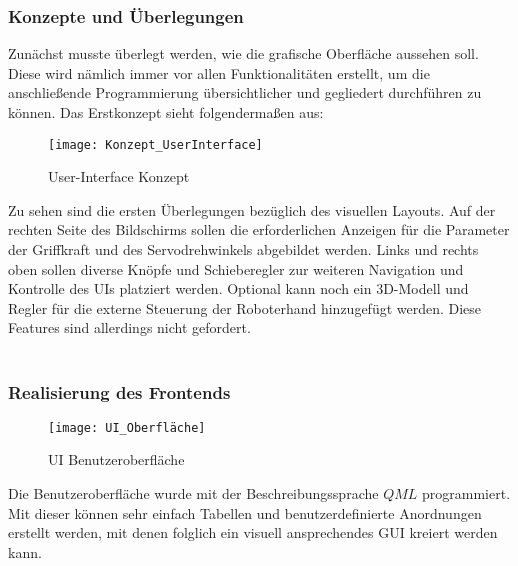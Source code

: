 \documentclass[titlepage,12pt,twoside]{article}
\begin{document}
\subsubsection{Konzepte und Überlegungen}
Zunächst musste überlegt werden, wie die grafische Oberfläche aussehen soll. Diese wird nämlich immer vor allen Funktionalitäten 
erstellt, um die anschließende Programmierung übersichtlicher und gegliedert durchführen zu können. Das Erstkonzept sieht folgendermaßen aus:
\begin{figure}[H]
	\begin{center}
		\scalebox{1.2}
		{\texttt{[image: Konzept\_UserInterface]}}
		\caption{User-Interface Konzept}
		\label{fig:Konzept_UserInterface}				
	\end{center}
\end{figure}
\hfill \break
Zu sehen sind die ersten Überlegungen bezüglich des visuellen Layouts. Auf der rechten Seite des Bildschirms sollen die erforderlichen
Anzeigen für die Parameter der Griffkraft und des Servodrehwinkels abgebildet werden. Links und rechts oben sollen diverse Knöpfe 
und Schieberegler zur weiteren Navigation und Kontrolle des UIs platziert werden. Optional kann noch ein 3D-Modell und Regler für 
die externe Steuerung der Roboterhand hinzugefügt werden. Diese Features sind allerdings nicht gefordert. \\
\\
\subsubsection{Realisierung des Frontends}
\begin{figure}[H]
	\begin{center}
		\scalebox{1.2}
		{\texttt{[image: UI\_Oberfläche]}}
		\caption{UI Benutzeroberfläche}
		\label{fig:UI_Oberfläche}				
	\end{center}
\end{figure}
\hfill \break
Die Benutzeroberfläche wurde mit der Beschreibungssprache $QML$ programmiert. Mit dieser können sehr einfach Tabellen und benutzerdefinierte
Anordnungen erstellt werden, mit denen folglich ein visuell ansprechendes GUI kreiert werden kann. \\
\\
\end{document}

